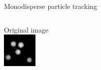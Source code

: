 \documentclass{beamer}
\begin{document}
\begin{frame}{Monodisperse particle tracking}
	\begin{columns}[T]
	Original image\\
	\includegraphics[width=\textwidth]{dillute_raw}
	

\end{columns}
\end{frame}
\end{document}
